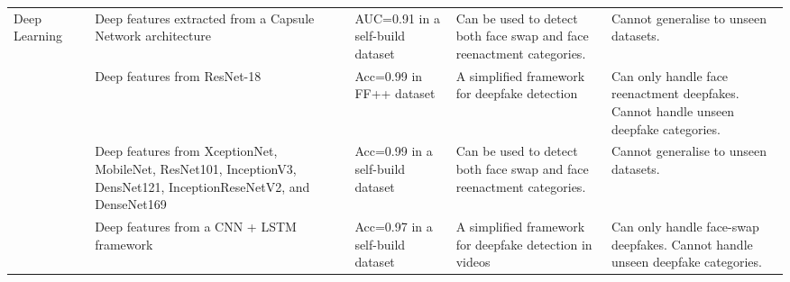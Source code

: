 \begin{table*}[htbp]
{\begin{tabular}{|p{2cm}|p{1cm}|p{5cm}|p{3cm}|p{5cm}|p{5cm}|}
\multirow{9}{*}{Deep Learning}     & \cite{afchar2018mesonet}            & Deep features extracted from a Capsule Network architecture                                                            & AUC=0.91 in a self-build dataset                                            & Can be used to detect both face swap and face reenactment categories.                                                                                                                                                                       & Cannot generalise to unseen datasets.                                                                 \\ \cline{2-6} 
                                   & \cite{kumar2020detecting}           & Deep features from ResNet-18                                                                                           & Acc=0.99 in FF++ dataset \cite{rossler2019faceforensics++}                           & A simplified framework for deepfake detection                                                                                                                                                                                               & Can only handle face reenactment deepfakes. Cannot handle unseen deepfake categories.                 \\ \cline{2-6} 
                                   & \cite{rana2020deepfakestack}        & Deep features from XceptionNet, MobileNet, ResNet101, InceptionV3, DensNet121, InceptionReseNetV2, and DenseNet169     & Acc=0.99 in a self-build dataset                                            & Can be used to detect both face swap and face reenactment categories.                                                                                                                                                                       & Cannot generalise to unseen datasets.                                                                 \\ \cline{2-6} 
                                   & \cite{guera2018deepfake}            & Deep features from a CNN + LSTM framework                                                                              & Acc=0.97 in a self-build dataset                                            & A simplified framework for deepfake detection in videos                                                                                                                                                                                     & Can only handle face-swap deepfakes. Cannot handle unseen deepfake categories.                        \\ \cline{2-6} 

\end{tabular}}
\end{table*}
